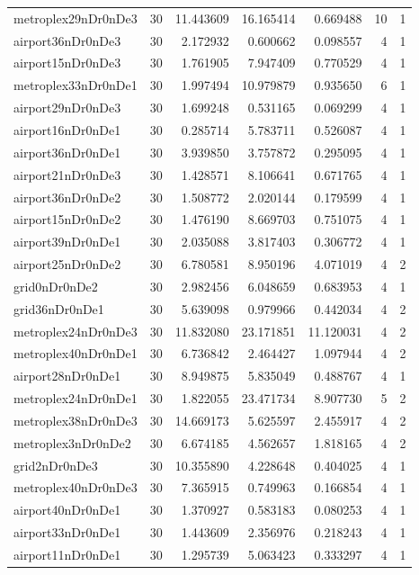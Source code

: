 \begin{longtable}{|l|r|r|r|r|r|r|}
metroplex29nDr0nDe3 & 30 & 11.443609 & 16.165414 & 0.669488 & 10 & 1 \\
airport36nDr0nDe3 & 30 & 2.172932 & 0.600662 & 0.098557 & 4 & 1 \\
airport15nDr0nDe3 & 30 & 1.761905 & 7.947409 & 0.770529 & 4 & 1 \\
metroplex33nDr0nDe1 & 30 & 1.997494 & 10.979879 & 0.935650 & 6 & 1 \\
airport29nDr0nDe3 & 30 & 1.699248 & 0.531165 & 0.069299 & 4 & 1 \\
airport16nDr0nDe1 & 30 & 0.285714 & 5.783711 & 0.526087 & 4 & 1 \\
airport36nDr0nDe1 & 30 & 3.939850 & 3.757872 & 0.295095 & 4 & 1 \\
airport21nDr0nDe3 & 30 & 1.428571 & 8.106641 & 0.671765 & 4 & 1 \\
airport36nDr0nDe2 & 30 & 1.508772 & 2.020144 & 0.179599 & 4 & 1 \\
airport15nDr0nDe2 & 30 & 1.476190 & 8.669703 & 0.751075 & 4 & 1 \\
airport39nDr0nDe1 & 30 & 2.035088 & 3.817403 & 0.306772 & 4 & 1 \\
airport25nDr0nDe2 & 30 & 6.780581 & 8.950196 & 4.071019 & 4 & 2 \\
grid0nDr0nDe2 & 30 & 2.982456 & 6.048659 & 0.683953 & 4 & 1 \\
grid36nDr0nDe1 & 30 & 5.639098 & 0.979966 & 0.442034 & 4 & 2 \\
metroplex24nDr0nDe3 & 30 & 11.832080 & 23.171851 & 11.120031 & 4 & 2 \\
metroplex40nDr0nDe1 & 30 & 6.736842 & 2.464427 & 1.097944 & 4 & 2 \\
airport28nDr0nDe1 & 30 & 8.949875 & 5.835049 & 0.488767 & 4 & 1 \\
metroplex24nDr0nDe1 & 30 & 1.822055 & 23.471734 & 8.907730 & 5 & 2 \\
metroplex38nDr0nDe3 & 30 & 14.669173 & 5.625597 & 2.455917 & 4 & 2 \\
metroplex3nDr0nDe2 & 30 & 6.674185 & 4.562657 & 1.818165 & 4 & 2 \\
grid2nDr0nDe3 & 30 & 10.355890 & 4.228648 & 0.404025 & 4 & 1 \\
metroplex40nDr0nDe3 & 30 & 7.365915 & 0.749963 & 0.166854 & 4 & 1 \\
airport40nDr0nDe1 & 30 & 1.370927 & 0.583183 & 0.080253 & 4 & 1 \\
airport33nDr0nDe1 & 30 & 1.443609 & 2.356976 & 0.218243 & 4 & 1 \\
airport11nDr0nDe1 & 30 & 1.295739 & 5.063423 & 0.333297 & 4 & 1 \\

\end{longtable}
